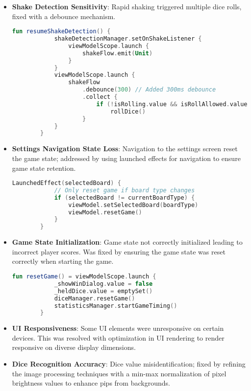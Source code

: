 \begin{itemize}

    \item \textbf{Shake Detection Sensitivity}: Rapid shaking triggered multiple dice rolls, fixed with a debounce mechanism.
    \begin{lstlisting}[language=Kotlin, caption=Fix for Shake Detection Sensitivity, label=lst:shake_detection_fix_code]
        fun resumeShakeDetection() {
            shakeDetectionManager.setOnShakeListener {
                viewModelScope.launch {
                    shakeFlow.emit(Unit)
                }
            }
            viewModelScope.launch {
                shakeFlow
                    .debounce(300) // Added 300ms debounce
                    .collect {
                        if (!isRolling.value && isRollAllowed.value) 
                            rollDice()
                    }
            }
        } 
    \end{lstlisting}

    \item \textbf{Settings Navigation State Loss}: Navigation to the settings screen reset the game state; addressed by using launched effects for navigation to ensure game state retention.
    \begin{lstlisting}[language=Kotlin, caption=Fix for Settings Navigation State Loss, label=lst:setting_navigation_fix_code]
        LaunchedEffect(selectedBoard) {
            // Only reset game if board type changes
            if (selectedBoard != currentBoardType) {
                viewModel.setSelectedBoard(boardType)
                viewModel.resetGame()
            }
        } 
    \end{lstlisting}

    \item \textbf{Game State Initialization}: Game state not correctly initialized leading to incorrect player scores. Was fixed by ensuring the game state was reset correctly when starting the game.
    \begin{lstlisting}[language=Kotlin, caption=Fix for Game State Initialization, label=lst:game_state_reset]
        fun resetGame() = viewModelScope.launch {
            _showWinDialog.value = false
            _heldDice.value = emptySet()
            diceManager.resetGame()
            statisticsManager.startGameTiming()
        } 
    \end{lstlisting}
    \item \textbf{UI Responsiveness}: Some UI elements were unresponsive on certain devices. This was resolved with optimization in UI rendering to render responsive on diverse display dimensions.
   
    \item \textbf{Dice Recognition Accuracy}: Dice value misidentification; fixed by refining the image processing techniques with a min-max normalization of pixel brightness values to enhance pips from backgrounds.
\end{itemize}

